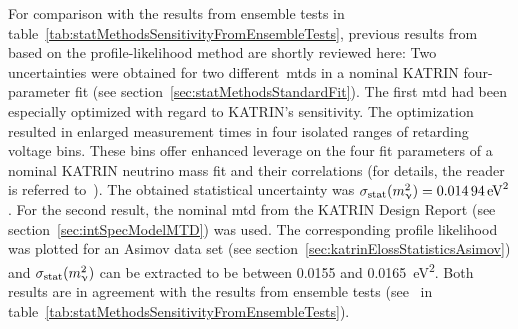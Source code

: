 For comparison with the results from ensemble tests in table~\ref{tab:statMethodsSensitivityFromEnsembleTests}, previous results from~\cite{Kleesiek2014} based on the profile-likelihood method are shortly reviewed here: Two uncertainties were obtained for two different~\gls{mtd}s in a nominal KATRIN four-parameter fit (see section~\ref{sec:statMethodsStandardFit}). The first \gls{mtd} had been especially optimized with regard to KATRIN's sensitivity. The optimization resulted in enlarged measurement times in four isolated ranges of retarding voltage bins. These bins offer enhanced leverage on the four fit parameters of a nominal KATRIN neutrino mass fit and their correlations (for details, the reader is referred to~\cite{Kleesiek2014}). The obtained statistical uncertainty was $\sigma_\mathrm{stat}(m_\upnu^2)=\SI{0.01494}{eV^2}$. For the second result, the nominal \gls{mtd} from the KATRIN Design Report (see section~\ref{sec:intSpecModelMTD}) was used. The corresponding profile likelihood was plotted for an Asimov data set (see section~\ref{sec:katrinElossStatisticsAsimov}) and $\sigma_\mathrm{stat}(m_\upnu^2)$ can be extracted to be between \SI{0.0155}{} and \SI{0.0165}{eV^2}. Both results are in agreement with the results from ensemble tests (see~\cite{Kleesiek2014} in table~\ref{tab:statMethodsSensitivityFromEnsembleTests}).